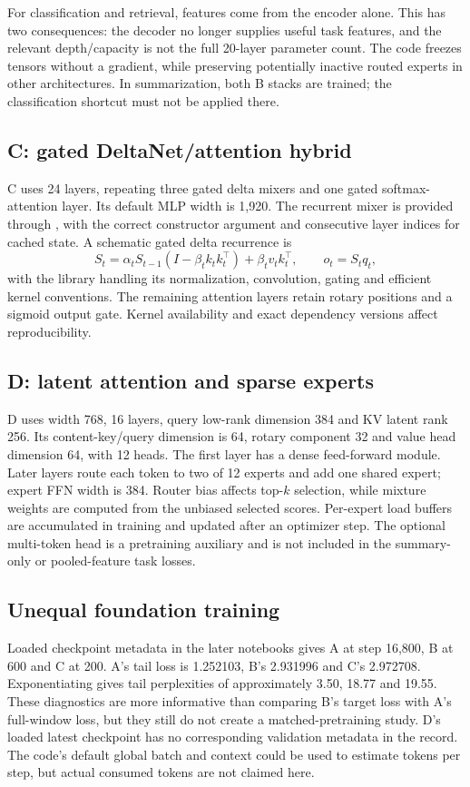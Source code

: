 For classification and retrieval, features come from the encoder alone. This has two consequences:
the decoder no longer supplies useful task features, and the relevant depth/capacity is not the full
20-layer parameter count. The code freezes tensors without a gradient, while preserving potentially
inactive routed experts in other architectures. In summarization, both B stacks are trained; the
classification shortcut must not be applied there.

\subsection{C: gated DeltaNet/attention hybrid}
C uses 24 layers, repeating three gated delta mixers and one gated softmax-attention layer. Its default
MLP width is 1,920. The recurrent mixer is provided through , with the
correct  constructor argument and consecutive layer indices for cached state. A
schematic gated delta recurrence is
\[
S_t=\alpha_t S_{t-1}(I-\beta_t k_tk_t^\top)+\beta_t v_tk_t^\top,
\qquad o_t=S_tq_t,
\]
with the library handling its normalization, convolution, gating and efficient kernel conventions.
The remaining attention layers retain rotary positions and a sigmoid output gate. Kernel availability
and exact dependency versions affect reproducibility.

\subsection{D: latent attention and sparse experts}
D uses width 768, 16 layers, query low-rank dimension 384 and KV latent rank 256. Its content-key/query
dimension is 64, rotary component 32 and value head dimension 64, with 12 heads. The first layer has a
dense feed-forward module. Later layers route each token to two of 12 experts and add one shared expert;
expert FFN width is 384. Router bias affects top-$k$ selection, while mixture weights are computed from
the unbiased selected scores. Per-expert load buffers are accumulated in training and updated after an
optimizer step. The optional multi-token head is a pretraining auxiliary and is not included in the
summary-only or pooled-feature task losses.

\subsection{Unequal foundation training}
Loaded checkpoint metadata in the later notebooks gives A at step 16,800, B at 600 and C at 200.
A's tail loss is 1.252103, B's 2.931996 and C's 2.972708. Exponentiating gives tail perplexities of
approximately 3.50, 18.77 and 19.55. These diagnostics are more informative than comparing B's target
loss with A's full-window loss, but they still do not create a matched-pretraining study. D's loaded latest
checkpoint has no corresponding validation metadata in the record. The code's default global batch and
context could be used to estimate tokens per step, but actual consumed tokens are not claimed here.

